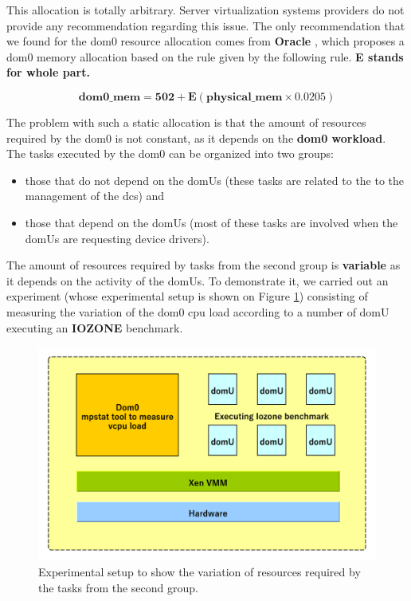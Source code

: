 This allocation is totally arbitrary. Server virtualization systems providers do not provide any recommendation regarding this issue. The only recommendation that we found for the dom0 resource allocation comes from \textbf{Oracle} \citep{oracle}, which proposes a dom0 memory allocation based on the rule given by the following rule. \textbf{E stands for whole part.}

\begin{equation*}
    \mathbf{dom0\_mem = 502 + E(physical\_mem\times 0.0205)}
\end{equation*}

\par The problem with such a static allocation is that the amount of resources required by the dom0 is not constant, as it depends on the \textbf{dom0 workload}. The tasks executed by the dom0 can be organized into two groups: 

\begin{itemize}
    \item those that do not depend on the domUs (these tasks are related to the to the management of the \glspl{dc}) and 
    \item those that depend on the domUs (most of these tasks are involved when the domUs are requesting device drivers).
\end{itemize}

The amount of resources required by tasks from the second group is \textbf{variable} as it depends on the activity of the domUs. To demonstrate it, we carried out an experiment (whose experimental setup is shown on Figure \ref{fig:expe-setup1}) consisting of measuring the variation of the dom0 \acrshort{cpu} load according to a number of domU executing an \textbf{IOZONE} \citep{iozone} benchmark.

\begin{figure}[!h]
    \centering
    \includegraphics[scale=0.65]{fig03/expe1.pdf}
    \caption{Experimental setup to show the variation of resources required by the tasks from the second group.}
    \label{fig:expe-setup1}
\end{figure}

